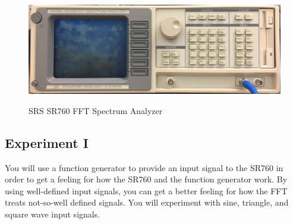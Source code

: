 \documentclass{../lab}
\begin{document}
\begin{figure}[h]
    \centering
    \href{http://experimentationlab.berkeley.edu/sites/default/files/images/LLSimage_SR760FFT.jpg}{\includegraphics[width=0.8\linewidth,keepaspectratio]{images/LLSimage_SR760FFT.jpg}}
    \caption{SRS SR760 FFT Spectrum Analyzer}
    \label{fig:LLSimage_SR760FFT.jpg}
\end{figure}

\subsection{Experiment I}

You will use a function generator to provide an input signal to the SR760 in order to get a feeling for how the SR760 and the function generator work. By using well-defined input signals, you can get a better feeling for how the FFT treats not-so-well defined signals. You will experiment with sine, triangle, and square wave input signals.
\end{document}
